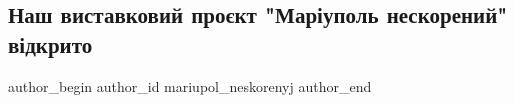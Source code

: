  
 
 
 
 

\subsection{Наш виставковий проєкт "Маріуполь нескорений" відкрито}
\label{sec:22_08_2023.fb.mariupol_neskorenyj.1.nash_vystavkovyj_proekt_mariupol_neskorenyj_vidkryto}

\ifcmt
 author_begin
   author_id mariupol_neskorenyj
 author_end
\fi
